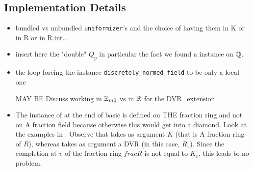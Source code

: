 \documentclass[sigplan,10pt,anonymous,review]{acmart}\settopmatter{printfolios=true,printccs=false,printacmref=false}
\begin{document}
\subsection{Implementation Details}
\begin{itemize}
\item bundled vs unbundled \texttt{uniformizer}'s and the choice of having them in K or in R or in R.int\dots
\item insert here the "double" $Q_p$ in particular the fact we found a  instance on $\mathbb{Q}$.
\item the loop forcing the instance \texttt{discretely\_normed\_field} to be only a local one
\item [MAY BE] Discuss working in $\mathbb{Z}_{m0}$ vs in $\mathbb{R}$ for the DVR\_extension
\item The instance of  at the end of basic is defined on THE fraction ring and not on A fraction field because otherwise this would get into a diamond. Look at the examples in . Observe that  takes as argument $K$ (that is A fraction ring of $R$), whereas  takes as argument a DVR (in this case, $R_v$). Since the completion at $v$ of the fraction ring $frac R$ is not equal to $K_v$, this leads to no problem.
\end{itemize}
\end{document}
